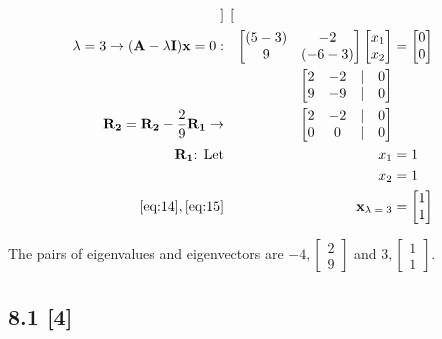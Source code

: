 \documentclass{article}
\begin{document}
\begin{align}
\begin{bmatrix}
    \end{bmatrix}
    \\
    \label{eq:11}
    \lambda = 3 \rightarrow (\textbf{A} - \lambda\textbf{I})\textbf{x}=0: && \begin{bmatrix}
    (5-3) & -2\\
    9 & (-6-3)
    \end{bmatrix} \begin{bmatrix}
    x_1\\x_2
    \end{bmatrix} &= \begin{bmatrix}
    0\\0
    \end{bmatrix}
    \\
    \label{eq:12}
    &&\begin{bmatrix}
    2&-2 &|& 0\\
    9&-9 &|& 0
    \end{bmatrix}
    \\
    \label{eq:13}
    \textbf{R\textsubscript{2}} = \textbf{R\textsubscript{2}}-\frac{2}{9}\textbf{R\textsubscript{1}} \rightarrow && \begin{bmatrix}
    2&-2&|&0\\
    0&0&|&0
    \end{bmatrix}
    \\
    \label{eq:14}
    \textbf{R\textsubscript{1}} \text{:  Let} && x_1 &= 1
    \\
    \label{eq:15}
    && x_2 &= 1
    \\
    \label{eq:16}
    \eqref{eq:14}, \eqref{eq:15} && \textbf{x\textsubscript{$\lambda=3$}} &= \begin{bmatrix}
    1\\1
    \end{bmatrix}
\end{align}

The pairs of eigenvalues and eigenvectors are $-4, \begin{bmatrix} 2\\9 \end{bmatrix}$ and $3, \begin{bmatrix} 1\\1 \end{bmatrix}$.

\subsection*{8.1 [4]}
\setcounter{equation}{0}
\end{document}
